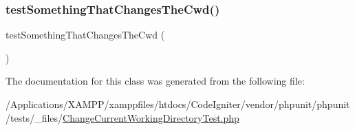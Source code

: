 \subsubsection{\texorpdfstring{test\+Something\+That\+Changes\+The\+Cwd()}{testSomethingThatChangesTheCwd()}}
{\footnotesize\ttfamily test\+Something\+That\+Changes\+The\+Cwd (\begin{DoxyParamCaption}{ }\end{DoxyParamCaption})}



The documentation for this class was generated from the following file\+:\begin{DoxyCompactItemize}
\item 
/\+Applications/\+X\+A\+M\+P\+P/xamppfiles/htdocs/\+Code\+Igniter/vendor/phpunit/phpunit/tests/\+\_\+files/\mbox{\hyperlink{_change_current_working_directory_test_8php}{Change\+Current\+Working\+Directory\+Test.\+php}}\end{DoxyCompactItemize}
